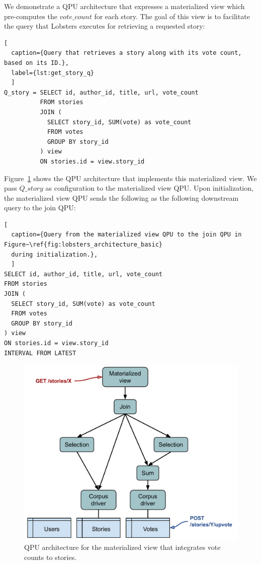 \noindent
We demonstrate a QPU architecture that expresses a materialized view which pre-computes the $vote\_count$ for each story.
The goal of this view is to facilitate the query that Lobsters executes for retrieving a requested story:

\begin{lstlisting}[
  caption={Query that retrieves a story along with its vote count, based on its ID.},
  label={lst:get_story_q}
  ]
Q_story = SELECT id, author_id, title, url, vote_count
          FROM stories
          JOIN (
            SELECT story_id, SUM(vote) as vote_count
            FROM votes
            GROUP BY story_id
          ) view
          ON stories.id = view.story_id
\end{lstlisting}

\noindent
Figure~\ref{fig:lobsters_architecture_basic} shows the QPU architecture that implements this materialized view.
We pass $Q\_story$ as configuration to the materialized view QPU.
Upon initialization, the materialized view QPU sends the following as the following downstream query to the join QPU:


\begin{lstlisting}[
  caption={Query from the materialized view QPU to the join QPU in Figure~\ref{fig:lobsters_architecture_basic}
  during initialization.},
  ]
SELECT id, author_id, title, url, vote_count
FROM stories
JOIN (
  SELECT story_id, SUM(vote) as vote_count
  FROM votes
  GROUP BY story_id
) view
ON stories.id = view.story_id
INTERVAL FROM LATEST
\end{lstlisting}

\begin{figure}[t]
  \centering
    \includegraphics[scale=0.5]{./figures/case_studies/lobsters_architecture_basic.pdf}
  \caption{QPU architecture for the materialized view that integrates vote counts to stories.}
  \label{fig:lobsters_architecture_basic}
\end{figure}

